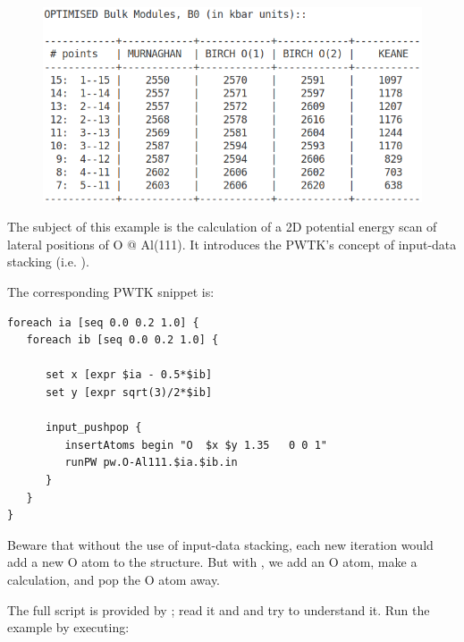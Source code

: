 \documentclass[landscape]{foils}
\begin{document}
\begin{figure}
\centering
\includegraphics[width=15.0cm]{figs/BULK_MODULES.png}
\end{figure}


The subject of this example is the calculation of a 2D potential
energy scan of lateral positions of O @ Al(111). It introduces the
PWTK's concept of input-data stacking (i.e. ).

The corresponding PWTK snippet is:
{\codecolor\small
\begin{verbatim}
foreach ia [seq 0.0 0.2 1.0] {
   foreach ib [seq 0.0 0.2 1.0] {

      set x [expr $ia - 0.5*$ib]
      set y [expr sqrt(3)/2*$ib]

      input_pushpop {
         insertAtoms begin "O  $x $y 1.35   0 0 1"
         runPW pw.O-Al111.$ia.$ib.in
      }
   }
}
\end{verbatim}
}

Beware that without the use of input-data stacking, each new iteration
would add a new O atom to the structure. But with , we add an O atom, make a calculation, and pop the O atom
away.

The full script is provided by ; read it and and try
to understand it. Run the example by executing:\\
\end{document}
